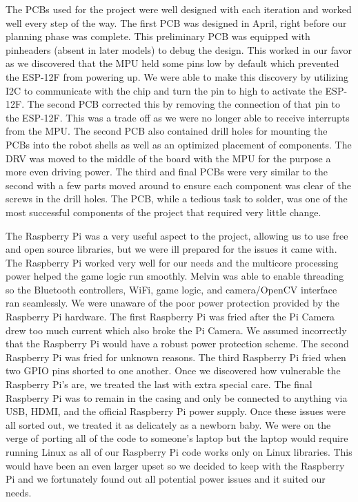 \documentclass[11pt]{ieeeconf}
\begin{document}
The PCBs used for the project were well designed with each iteration and worked well every step of the way. The first PCB was designed in April, right before our planning phase was complete. This preliminary PCB was equipped with pinheaders (absent in later models) to debug the design. This worked in our favor as we discovered that the MPU held some pins low by default which prevented the ESP-12F from powering up. We were able to make this discovery by utilizing I2C to communicate with the chip and turn the pin to high to activate the ESP-12F. The second PCB corrected this by removing the connection of that pin to the ESP-12F. This was a trade off as we were no longer able to receive interrupts from the MPU. The second PCB also contained drill holes for mounting the PCBs into the robot shells as well as an optimized placement of components. The DRV was moved to the middle of the board with the MPU for the purpose a more even driving power. The third and final PCBs were very similar to the second with a few parts moved around to ensure each component was clear of the screws in the drill holes. The PCB, while a tedious task to solder, was one of the most successful components of the project that required very little change.  

The Raspberry Pi was a very useful aspect to the project, allowing us to use free and open source libraries, but we were ill prepared for the issues it came with. The Raspberry Pi worked very well for our needs and the multicore processing power helped the game logic run smoothly. Melvin was able to enable threading so the Bluetooth controllers, WiFi, game logic, and camera/OpenCV interface ran seamlessly. We were unaware of the poor power protection provided by the Raspberry Pi hardware. The first Raspberry Pi was fried after the Pi Camera drew too much current which also broke the Pi Camera. We assumed incorrectly that the Raspberry Pi would have a robust power protection scheme. The second Raspberry Pi was fried for unknown reasons. The third Raspberry Pi fried when two GPIO pins shorted to one another. Once we discovered how vulnerable the Raspberry Pi's are, we treated the last with extra special care. The final Raspberry Pi was to remain in the casing and only be connected to anything via USB, HDMI, and the official Raspberry Pi power supply. Once these issues were all sorted out, we treated it as delicately as a newborn baby. We were on the verge of porting all of the code to someone's laptop but the laptop would require running Linux as all of our Raspberry Pi code works only on Linux libraries. This would have been an even larger upset so we decided to keep with the Raspberry Pi and we fortunately found out all potential power issues and it suited our needs. 
\end{document}

